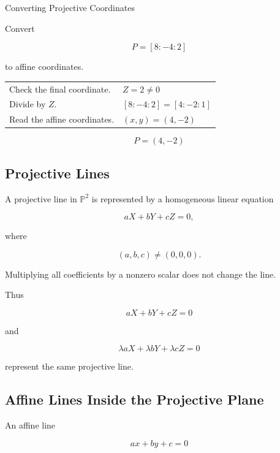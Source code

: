 \begin{workedexamplebox}{Converting Projective Coordinates}

Convert

\[
P=[8:-4:2]
\]

to affine coordinates.

\begin{tabularx}{\textwidth}{@{}>{\raggedright\arraybackslash}p{}X@{}}
Check the final coordinate. &
\(Z=2\neq0\)\\
Divide by \(Z\). &
\([8:-4:2]=[4:-2:1]\)\\
Read the affine coordinates. &
\((x,y)=(4,-2)\)
\end{tabularx}

\begin{answerbox}
\[
\boxed{P=(4,-2)}
\]
\end{answerbox}
\end{workedexamplebox}

\subsection{Projective Lines}
\label{subsec:projective-lines}

A projective line in \(\mathbb{P}^{2}\) is represented by a homogeneous
linear equation

\[
\boxed{
aX+bY+cZ=0,
}
\]

where

\[
(a,b,c)\neq(0,0,0).
\]

Multiplying all coefficients by a nonzero scalar does not change the line.

Thus

\[
aX+bY+cZ=0
\]

and

\[
\lambda aX+\lambda bY+\lambda cZ=0
\]

represent the same projective line.

\subsection{Affine Lines Inside the Projective Plane}
\label{subsec:affine-lines-projective-plane}

An affine line

\[
ax+by+c=0
\]

